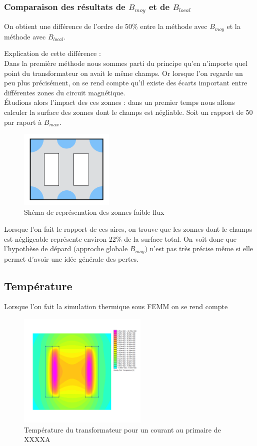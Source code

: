 \subsubsection{Comparaison des résultats de $B_{moy}$ et de $B_{local}$}

On obtient une différence de l'ordre de 50\% entre la méthode avec $B_{moy}$  et la méthode avec $B_{local}$.

Explication de cette différence : \\
	Dans la première méthode nous sommes parti du principe qu'en n'importe quel point du transformateur on avait le même champs. Or lorsque l'on regarde un peu plus précisément, on se rend compte qu'il existe des écarts important entre différentes zones du circuit magnétique.\\
Étudions alors l'impact des ces zonnes : dans un premier temps nous allons calculer la surface des zonnes dont le champs est négliable. Soit un rapport de 50 par raport à $B_{max}$.

\begin{figure}[ht]
	\begin{center}
	\includegraphics[width=0.4\textwidth]{images/TP3_zones_mortes}
	\caption{Shéma de représenation des zonnes faible flux}\label{img:RepChamps}
	\end{center}
\end{figure}
\FloatBarrier

Lorsque l'on fait le rapport de ces aires, on trouve que les zonnes dont le champs est négligeable représente environ 22\% de la surface total. On voit donc que l'hypothèse de dépard (approche globale $B_{moy}$) n'est pas très précise même si elle permet d'avoir une idée générale des pertes.


\subsection{Température}

Lorsque l'on fait la simulation thermique sous FEMM on se rend compte 
\begin{figure}[ht]
	\begin{center}
	\includegraphics[width=0.55\textwidth]{images/TP3_thermo}
	\caption{Température du transformateur pour un courant au primaire de XXXXA}\label{img:TransfoThermo}
	\end{center}
\end{figure}
